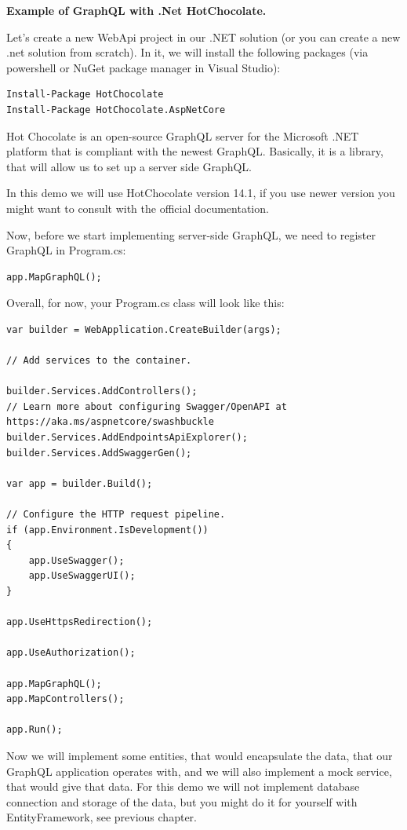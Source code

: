 \textbf{Example of GraphQL with .Net HotChocolate.}

Let's create a new WebApi project in our .NET solution (or you can create a new .net solution from scratch). In it, we will install the following packages (via powershell or NuGet package manager in Visual Studio):

\begin{lstlisting}
Install-Package HotChocolate
Install-Package HotChocolate.AspNetCore
\end{lstlisting}

Hot Chocolate is an open-source GraphQL server for the Microsoft .NET platform that is compliant with the newest GraphQL. Basically, it is a library, that will allow us to set up a server side GraphQL.

In this demo we will use HotChocolate version 14.1, if you use newer version you might want to consult with the official documentation.

Now, before we start implementing server-side GraphQL, we need to register GraphQL in Program.cs:

\begin{lstlisting}
app.MapGraphQL();
\end{lstlisting}

Overall, for now, your Program.cs class will look like this:

\begin{lstlisting}
var builder = WebApplication.CreateBuilder(args);

// Add services to the container.

builder.Services.AddControllers();
// Learn more about configuring Swagger/OpenAPI at https://aka.ms/aspnetcore/swashbuckle
builder.Services.AddEndpointsApiExplorer();
builder.Services.AddSwaggerGen();

var app = builder.Build();

// Configure the HTTP request pipeline.
if (app.Environment.IsDevelopment())
{
    app.UseSwagger();
    app.UseSwaggerUI();
}

app.UseHttpsRedirection();

app.UseAuthorization();

app.MapGraphQL();
app.MapControllers();

app.Run();
\end{lstlisting}

Now we will implement some entities, that would encapsulate the data, that our GraphQL application operates with, and we will also implement a mock service, that would give that data. For this demo we will not implement database connection and storage of the data, but you might do it for yourself with EntityFramework, see previous chapter.

